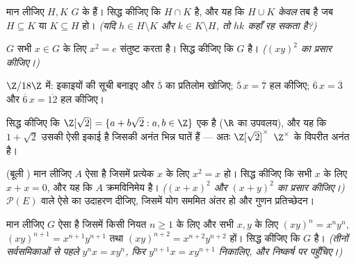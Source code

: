 \begin{exercise}[$\star\star$]\label{exo:b1:structures:6}
मान लीजिए $H, K$ $G$ के  हैं। सिद्ध कीजिए कि $H \cap K$  है, और
यह कि $H \cup K$ \emph{केवल} तब  है जब $H \subseteq K$ या $K \subseteq
H$ हो। \emph{(यदि $h \in H \setminus K$ और $k \in K \setminus H$, तो $hk$
कहाँ रह सकता है?)}
\end{exercise}

\begin{exercise}[$\star\star$]\label{exo:b1:structures:7}
 $G$ सभी $x \in G$ के लिए $x^2 = e$ संतुष्ट करता है। सिद्ध कीजिए कि $G$
 है। \emph{($(xy)^2$ का प्रसार कीजिए।)}
\end{exercise}

\begin{exercise}[$\star\star$]\label{exo:b1:structures:8}
$\Z/18\Z$ में: इकाइयों की सूची बनाइए और $\overline 5$ का प्रतिलोम खोजिए;
$\overline 5\, x = \overline 7$ हल कीजिए; $\overline 6\, x = \overline 3$ और
$\overline 6\, x = \overline{12}$ हल कीजिए।
\end{exercise}

\begin{exercise}[$\star\star$]\label{exo:b1:structures:9}
सिद्ध कीजिए कि  $\Z[\sqrt 2] = \{a + b\sqrt 2 : a, b \in \Z\}$ एक 
है ($\R$ का उपवलय), और यह कि $1 + \sqrt 2$ उसकी ऐसी इकाई है जिसकी अनंत भिन्न
घातें हैं --- अतः $\Z[\sqrt 2]^\times$ $\Z^\times$ के विपरीत अनंत है।
\end{exercise}

\begin{exercise}[$\star\star\star$]\label{exo:b1:structures:10}
(बूली ) मान लीजिए $A$ ऐसा  है जिसमें प्रत्येक $x$ के लिए $x^2 = x$ हो।
सिद्ध कीजिए कि सभी $x$ के लिए $x + x = 0$, और यह कि $A$ क्रमविनिमेय है।
\emph{($(x+x)^2$ और $(x+y)^2$ का प्रसार कीजिए।)} $\mathcal{P}(E)$ वाले ऐसे
 का उदाहरण दीजिए, जिसमें योग सममित अंतर हो और गुणन प्रतिच्छेदन।
\end{exercise}

\begin{exercise}[$\star\star\star$]\label{exo:b1:structures:11}
मान लीजिए $G$ ऐसा  है जिसमें किसी नियत $n \geq 1$ के लिए और सभी $x, y$
के लिए $(xy)^n = x^n y^n$, $(xy)^{n+1} = x^{n+1}y^{n+1}$ तथा $(xy)^{n+2} =
x^{n+2}y^{n+2}$ हों। सिद्ध कीजिए कि $G$  है। \emph{(तीनों सर्वसमिकाओं
से पहले $y^n x = x y^n$, फिर $y^{n+1} x = x y^{n+1}$ निकालिए, और निष्कर्ष पर
पहुँचिए।)}
\end{exercise}

